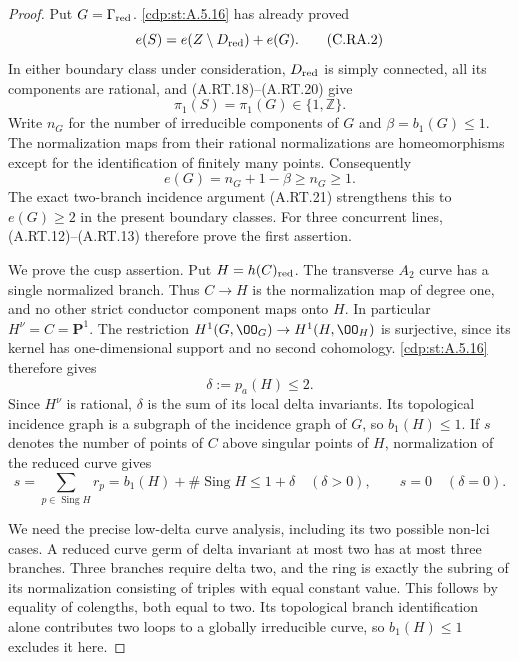 \begin{proof}
Put $G=\Gamma_{\rm red}$. \ref{cdp:st:A.5.16} has already proved
\[
 e(S)=e(Z\setminus D_{\rm red})+e(G).             \tag{C.RA.2}\label{cdp:eq:C.RA.2}
\]
In either boundary class under consideration, $D_{\rm red}$
is simply connected, all its components are rational, and
(A.RT.18)--(A.RT.20) give
\[
 \pi_1(S)=\pi_1(G)\in\{1,\mathbb Z\}.
 \tag{C.RA.3}\label{cdp:eq:C.RA.3}
\]
Write $n_G$ for the number of irreducible components of $G$
and $\beta=b_1(G)\le1$. The normalization maps from their
rational normalizations are homeomorphisms except for the
identification of finitely many points. Consequently
\[
                   e(G)=n_G+1-\beta\ge n_G\ge1.
 \tag{C.RA.4}\label{cdp:eq:C.RA.4}
\]
The exact two-branch incidence argument (A.RT.21) strengthens
this to $e(G)\ge2$ in the present boundary classes.
For three concurrent lines, (A.RT.12)--(A.RT.13) therefore
prove the first assertion.

We prove the cusp assertion. Put $H=h(C)_{\rm red}$.
The transverse $A_2$ curve has a single normalized branch.
Thus $C\to H$ is the normalization map of degree one, and
no other strict conductor component maps onto $H$.
In particular $H^\nu=C=\mathbf P^1$. The restriction
$H^1(G,\OO_G)\to H^1(H,\OO_H)$ is surjective, since its
kernel has one-dimensional support and no second cohomology.
\ref{cdp:st:A.5.16} therefore gives
\[
              \delta:=p_a(H)\le2.              \tag{C.RA.5}\label{cdp:eq:C.RA.5}
\]
Since $H^\nu$ is rational, $\delta$ is the sum of its local
delta invariants. Its topological incidence graph is a
subgraph of the incidence graph of $G$, so $b_1(H)\le1$.
If $s$ denotes the number of points of $C$ above singular
points of $H$, normalization of the reduced curve gives
\[
 s=\sum_{p\in\operatorname{Sing}H}r_p
   =b_1(H)+\#\operatorname{Sing}H\le1+\delta
 \quad(\delta>0),\qquad s=0\quad(\delta=0).       \tag{C.RA.6}\label{cdp:eq:C.RA.6}
\]

We need the precise low-delta curve analysis, including its
two possible non-lci cases. A reduced curve germ of delta
invariant at most two has at most three branches.
Three branches require delta two, and the ring is exactly
the subring of its normalization consisting of triples
with equal constant value. This follows by equality of
colengths, both equal to two. Its topological branch
identification alone contributes two loops to a globally
irreducible curve, so $b_1(H)\le1$ excludes it here.


\end{proof}
